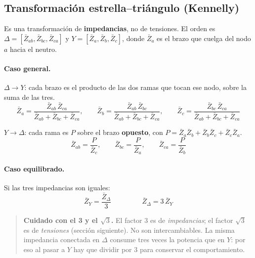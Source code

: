 \documentclass[11pt,a4paper]{article}
\begin{document}
\subsection{Transformación estrella--triángulo (Kennelly)}

Es una transformación de \textbf{impedancias}, no de tensiones. El orden es
$\Delta = [\bar{Z}_{ab},\bar{Z}_{bc},\bar{Z}_{ca}]$ y $Y = [\bar{Z}_a,\bar{Z}_b,\bar{Z}_c]$,
donde $\bar{Z}_a$ es el brazo que cuelga del nodo $a$ hacia el neutro.

\paragraph{Caso general.} $\Delta \to Y$: cada brazo es el producto de las dos ramas que
tocan ese nodo, sobre la suma de las tres.
\begin{equation}
  \bar{Z}_a = \frac{\bar{Z}_{ab}\,\bar{Z}_{ca}}{\bar{Z}_{ab}+\bar{Z}_{bc}+\bar{Z}_{ca}},
  \qquad
  \bar{Z}_b = \frac{\bar{Z}_{ab}\,\bar{Z}_{bc}}{\bar{Z}_{ab}+\bar{Z}_{bc}+\bar{Z}_{ca}},
  \qquad
  \bar{Z}_c = \frac{\bar{Z}_{bc}\,\bar{Z}_{ca}}{\bar{Z}_{ab}+\bar{Z}_{bc}+\bar{Z}_{ca}}
\end{equation}

\noindent $Y \to \Delta$: cada rama es $P$ sobre el brazo \textbf{opuesto}, con
$P = \bar{Z}_a\bar{Z}_b + \bar{Z}_b\bar{Z}_c + \bar{Z}_c\bar{Z}_a$.
\begin{equation}
  \bar{Z}_{ab} = \frac{P}{\bar{Z}_c},
  \qquad
  \bar{Z}_{bc} = \frac{P}{\bar{Z}_a},
  \qquad
  \bar{Z}_{ca} = \frac{P}{\bar{Z}_b}
\end{equation}

\paragraph{Caso equilibrado.} Si las tres impedancias son iguales:
\begin{equation}
  \boxed{\ \bar{Z}_Y = \frac{\bar{Z}_\Delta}{3} \ }
  \qquad\qquad
  \boxed{\ \bar{Z}_\Delta = 3\,\bar{Z}_Y \ }
\end{equation}

\begin{quote}\small
\textbf{Cuidado con el 3 y el $\sqrt{3}$.} El factor $3$ es de \emph{impedancias};
el factor $\sqrt{3}$ es de \emph{tensiones} (sección siguiente). No son intercambiables.
La misma impedancia conectada en $\Delta$ consume tres veces la potencia que en $Y$:
por eso al pasar a $Y$ hay que dividir por 3 para conservar el comportamiento.
\end{quote}
\end{document}
